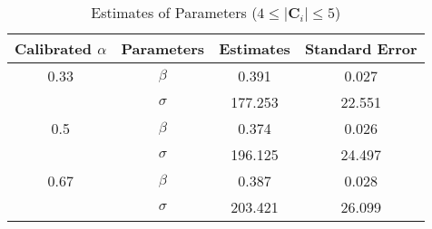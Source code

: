 \begin{table}[H]
    \centering
    \caption{Estimates of Parameters ($4 \leq |\mathbf{C}_i| \leq 5$)}
    \label{table: estimates (min_size=4 max_size=5 margin=2000)}
    \begin{tabular}{cccc}
        \toprule
        Calibrated $\alpha$ & Parameters & Estimates & Standard Error \\
        \midrule
        0.33                & $\beta$    & 0.391     & 0.027          \\
                            & $\sigma$   & 177.253   & 22.551         \\
        \midrule
        0.5                 & $\beta$    & 0.374     & 0.026          \\
                            & $\sigma$   & 196.125   & 24.497         \\
        \midrule
        0.67                & $\beta$    & 0.387     & 0.028          \\
                            & $\sigma$   & 203.421   & 26.099         \\
        \bottomrule
    \end{tabular}
\end{table}
